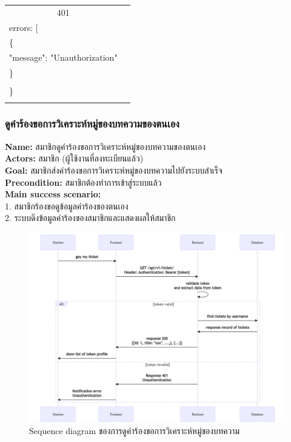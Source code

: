\documentclass[12pt,oneside,openright,a4paper]{cpe-thai-project}
\begin{document}
\begin{longtable}[!ht]{p{3cm}|p{8cm}}
    \multicolumn{1}{c|}{401}  &
    \begin{tabular}[c]{@{}l@{}}\{\\ \quad errors: {[}\\ \quad\quad\{\\ \quad\quad\quad"message": "Unauthorization"\\ \quad\quad\}\\\quad {]}\\ \}\end{tabular}                                                                         \\ \hline
    \hhline{==} 
\end{longtable}

\subsubsection{ดูคำร้องขอการวิเคราะห์หมู่ของบทความของตนเอง}
\textbf{Name: }สมาชิกดูคำร้องขอการวิเคราะห์หมู่ของบทความของตนเอง \\
\textbf{Actors: }สมาชิก (ผู้ใช้งานที่ลงทะเบียนแล้ว) \\
\textbf{Goal: }สมาชิกส่งคำร้องขอการวิเคราะห์หมู่ของบทความไปยังระบบสำเร็จ \\
\textbf{Precondition: }สมาชิกต้องทำการเข้าสู่ระบบแล้ว \\
\textbf{Main success scenario: } \\
  \hspace*{0.5cm}1. สมาชิกร้องขอดูข้อมูลคำร้องของตนเอง  \\
  \hspace*{0.5cm}2. ระบบดึงข้อมูลคำร้องของสมาชิกและแสดงผลให้สมาชิก \\ \newpage
\begin{figure}[!ht]\centering
  \includegraphics[width=\textwidth]{./img/seq_request.png}
  \caption{Sequence diagram ของการดูคำร้องขอการวิเคราะห์หมู่ของบทความ}\label{fig:seq_request} 
\end{figure} 
\end{document}
